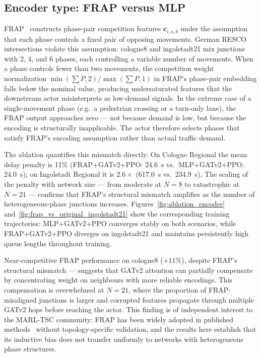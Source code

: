 \subsection{Encoder type: FRAP versus MLP}
\label{sec:ResultsAndDiscussion_EncoderAnalysis}

FRAP~\citep{zheng2019learning} constructs phase-pair competition features $\mathbf{c}_{i,a,b}$ under the assumption that each phase controls a fixed pair of opposing movements. German RESCO intersections violate this assumption: cologne8 and ingolstadt21 mix junctions with 2, 4, and 6 phases, each controlling a variable number of movements. When a phase controls fewer than two movements, the competition weight normalization $\min(\sum P, 2)/\max(\sum P, 1)$ in FRAP's phase-pair embedding falls below the nominal value, producing undersaturated features that the downstream actor misinterprets as low-demand signals. In the extreme case of a single-movement phase (e.g.\ a pedestrian crossing or a turn-only lane), the FRAP output approaches zero --- not because demand is low, but because the encoding is structurally inapplicable. The actor therefore selects phases that satisfy FRAP's encoding assumption rather than actual traffic demand.

The ablation quantifies this mismatch directly. On Cologne Regional the mean delay penalty is 11\% (FRAP+GATv2+PPO: 24.6~s vs.\ MLP+GATv2+PPO: 24.0~s); on Ingolstadt Regional it is $2.6\times$ (617.0~s vs.\ 234.9~s). The scaling of the penalty with network size --- from moderate at $N=8$ to catastrophic at $N=21$ --- confirms that FRAP's structural mismatch amplifies as the number of heterogeneous-phase junctions increases. Figures~\ref{fig:ablation_encoder} and~\ref{fig:frap_vs_original_ingolstadt21} show the corresponding training trajectories: MLP+GATv2+PPO converges stably on both scenarios, while FRAP+GATv2+PPO diverges on ingolstadt21 and maintains persistently high queue lengths throughout training.

Near-competitive FRAP performance on cologne8 ($+11\%$), despite FRAP's structural mismatch --- suggests that GATv2 attention can partially compensate by concentrating weight on neighbours with more reliable encodings. This compensation is overwhelmed at $N=21$, where the proportion of FRAP-misaligned junctions is larger and corrupted features propagate through multiple GATv2 hops before reaching the actor. This finding is of independent interest to the MARL-TSC community: FRAP has been widely adopted in published methods~\citep{zheng2019learning,wei2019colight} without topology-specific validation, and the results here establish that its inductive bias does not transfer uniformly to networks with heterogeneous phase structures.

